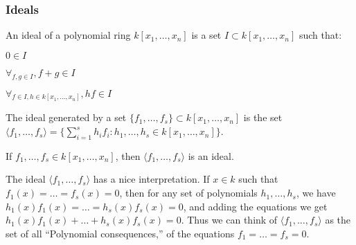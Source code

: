 \documentclass[crop=false,class=book,oneside]{standalone}
\begin{document}
            \subsubsection{Ideals}
                \begin{definition}
                    An ideal of a polynomial ring
                    $k[x_1,\hdots ,x_n]$ is a set
                    $I\subset k[x_1,\hdots ,x_n]$ such that:
                    \begin{enumerate}
                        \begin{multicols}{3}
                            \item $0\in I$
                            \item $\forall_{f,g\in I}, f+g\in I$ 
                            \item $\forall_{f\in I, h\in k[x_1,\hdots ,x_n]},%
                                   hf\in I$
                        \end{multicols}
                    \end{enumerate}
                \end{definition}
                \begin{definition}
                    The ideal generated by a set
                    $\{f_1,\hdots, f_s\}\subset k[x_1,\hdots ,x_n]$
                    is the set
                    $\langle f_1,\hdots,f_s\rangle%
                     =\{\sum_{i=1}^{s} h_i f_i:%
                        h_1,\hdots,h_s\in k[x_1,\hdots ,x_n]\}$.
                \end{definition}
                \begin{theorem}
                    If $f_1,\hdots, f_s\in k[x_1,\hdots ,x_n]$,
                    then $\langle f_1,\hdots, f_s\rangle$ is an ideal.
                \end{theorem}
                \begin{remark}
                    The ideal $\langle f_1,\hdots, f_s\rangle$ has a nice
                    interpretation. If $x\in k$ such that
                    $f_1(x)=\hdots=f_s(x)=0$, then for any set
                    of polynomials $h_1,\hdots, h_s$, we have
                    $h_1(x)f_1(x)=\hdots=h_s(x)f_s(x)=0$,
                    and adding the equations we get
                    $h_1(x)f_1(x)+\hdots+h_s(x)f_s(x)=0$.
                    Thus we can think of
                    $\langle f_1,\hdots,f_s\rangle$ as the set
                    of all ``Polynomial consequences,''
                    of the equations $f_1=\hdots=f_s=0$.
                \end{remark}
\end{document}
